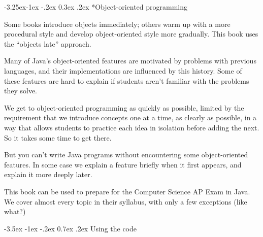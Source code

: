 \documentclass[12pt]{book}
\makeatletter
\theoremstyle{exercise}
\renewcommand{\section}{\@startsection{section}{1}{\z@}%
    {-3.5ex \@plus -1ex \@minus -.2ex}%
    {0.7ex \@plus.2ex}%
    {\normalfont\Large\bfseries}}
\renewcommand\subsection{\@startsection{subsection}{2}{\z@}%
    {-3.25ex\@plus -1ex \@minus -.2ex}%
    {0.3ex \@plus .2ex}%
    {\normalfont\large\bfseries}}
\makeatother
\begin{document}


\subsection*{Object-oriented programming}

Some books introduce objects immediately; others warm up with a more procedural style and develop object-oriented style more gradually.
This book uses the ``objects late'' approach.

Many of Java's object-oriented features are motivated by problems with previous languages, and their implementations are influenced by this history.  Some of these features are hard to explain if students aren't familiar with the problems they solve.

We get to object-oriented programming as quickly as possible, limited by the requirement that we introduce concepts one at a time, as clearly as possible, in a way that allows students to practice each idea in isolation before adding the next.
So it takes some time to get there.

But you can't write Java programs without encountering some object-oriented features.
In some case we explain a feature briefly when it first appears, and explain it more deeply later.



This book can be used to prepare for the Computer Science AP Exam in Java.
We cover almost every topic in their syllabus, with only a few exceptions (like what?)


\section{Using the code}
\label{code}
\end{document}
